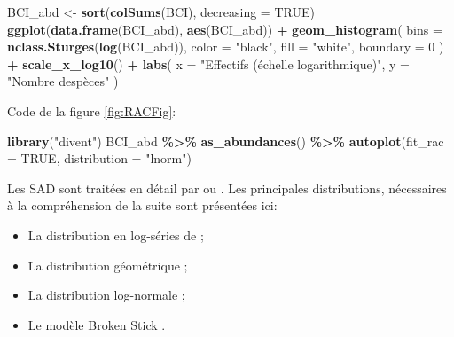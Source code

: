 \documentclass[
  11pt,
  american,
  a4paper,
  extrafontsizes,onecolumn,openright
  ]{memoir}
\newenvironment{Shaded}{\begin{snugshade}}{\end{snugshade}}
\newcommand{\AttributeTok}[1]{\textcolor[rgb]{0.13,0.29,0.53}{#1}}
\newcommand{\ConstantTok}[1]{\textcolor[rgb]{0.56,0.35,0.01}{#1}}
\newcommand{\DecValTok}[1]{\textcolor[rgb]{0.00,0.00,0.81}{#1}}
\newcommand{\FunctionTok}[1]{\textcolor[rgb]{0.13,0.29,0.53}{\textbf{#1}}}
\newcommand{\NormalTok}[1]{#1}
\newcommand{\OtherTok}[1]{\textcolor[rgb]{0.56,0.35,0.01}{#1}}
\newcommand{\SpecialCharTok}[1]{\textcolor[rgb]{0.81,0.36,0.00}{\textbf{#1}}}
\newcommand{\StringTok}[1]{\textcolor[rgb]{0.31,0.60,0.02}{#1}}
\providecommand{\tightlist}{%
  \setlength{\itemsep}{0pt}\setlength{\parskip}{0pt}}
\begin{document}
\begin{Shaded}
\begin{Highlighting}[]
\NormalTok{BCI\_abd }\OtherTok{\textless{}{-}} \FunctionTok{sort}\NormalTok{(}\FunctionTok{colSums}\NormalTok{(BCI), }\AttributeTok{decreasing =} \ConstantTok{TRUE}\NormalTok{)}
\FunctionTok{ggplot}\NormalTok{(}\FunctionTok{data.frame}\NormalTok{(BCI\_abd), }\FunctionTok{aes}\NormalTok{(BCI\_abd)) }\SpecialCharTok{+} 
  \FunctionTok{geom\_histogram}\NormalTok{(}
    \AttributeTok{bins =} \FunctionTok{nclass.Sturges}\NormalTok{(}\FunctionTok{log}\NormalTok{(BCI\_abd)), }
    \AttributeTok{color =} \StringTok{"black"}\NormalTok{, }
    \AttributeTok{fill =} \StringTok{"white"}\NormalTok{,}
    \AttributeTok{boundary =} \DecValTok{0}
\NormalTok{  ) }\SpecialCharTok{+}
  \FunctionTok{scale\_x\_log10}\NormalTok{() }\SpecialCharTok{+}
  \FunctionTok{labs}\NormalTok{(}
    \AttributeTok{x =} \StringTok{"Effectifs (échelle logarithmique)"}\NormalTok{, }
    \AttributeTok{y =} \StringTok{"Nombre d\textquotesingle{}espèces"}
\NormalTok{  )}
\end{Highlighting}
\end{Shaded}

\normalsize

Code de la figure \ref{fig:RACFig}:

\scriptsize

\begin{Shaded}
\begin{Highlighting}[]
\FunctionTok{library}\NormalTok{(}\StringTok{"divent"}\NormalTok{)}
\NormalTok{BCI\_abd }\SpecialCharTok{\%\textgreater{}\%} 
  \FunctionTok{as\_abundances}\NormalTok{() }\SpecialCharTok{\%\textgreater{}\%} 
  \FunctionTok{autoplot}\NormalTok{(}\AttributeTok{fit\_rac =} \ConstantTok{TRUE}\NormalTok{, }\AttributeTok{distribution =} \StringTok{"lnorm"}\NormalTok{)}
\end{Highlighting}
\end{Shaded}

\normalsize

Les SAD sont traitées en détail par \textcite{Magurran1988} ou \textcite{McGill2007}.
Les principales distributions, nécessaires à la compréhension de la suite sont présentées ici:

\begin{itemize}
\tightlist
\item
  La distribution en log-séries de \textcite{Fisher1943};
\item
  La distribution géométrique \autocite{Motomura1932,Whittaker1972};
\item
  La distribution log-normale \autocite{Preston1948};
\item
  Le modèle Broken Stick \autocite{MacArthur1957}.
\end{itemize}
\end{document}
